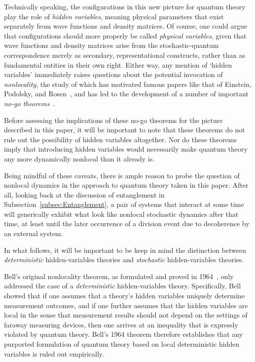 \documentclass[12pt,english,prl,superscriptaddress,nobibnotes,nofootinbib]{revtex4-2}
\begin{document}
Technically speaking, the configurations in this new picture for quantum
theory play the role of \emph{hidden variables}, meaning physical
parameters that exist separately from wave functions and density matrices.
Of course, one could argue that configurations should more properly
be called\emph{ }\emph{physical variables}, given that wave functions
and density matrices arise from the stochastic-quantum correspondence
merely as secondary, representational constructs, rather than as fundamental
entities in their own right. Either way, any mention of \textquoteleft hidden
variables\textquoteright{} immediately raises questions about the
potential invocation of \emph{nonlocality}, the study of which has
motivated famous papers like that of Einstein, Podolsky, and Rosen~\citep{EinsteinPodolskyRosen:1935cqmdprbcc},
and has led to the development of a number of important \emph{no-go theorems}~\citep{Bell:1964oeprp,ClauserHorneShimonyHolt:1969pettlhvt,Bell:1975ttolb,GreenbergerHorneZeilinger:1989gbbt}.

Before assessing the implications of these no-go theorems for the
picture described in this paper, it will be important to note that
these theorems do not rule out the possibility of hidden variables
altogether. Nor do these theorems imply that introducing hidden variables
would necessarily make quantum theory any more dynamically nonlocal
than it already is.

Being mindful of these caveats, there is ample reason to probe the
question of nonlocal dynamics in the approach to quantum theory taken
in this paper. After all, looking back at the discussion of entanglement
in Subsection~\ref{subsec:Entanglement}, a pair of systems that
interact at some time will generically exhibit what look like nonlocal
stochastic dynamics after that time, at least until the later occurrence
of a division event due to decoherence by an external system.

In what follows, it will be important to be keep in mind the distinction
between \emph{deterministic} hidden-variables theories and \emph{stochastic}
hidden-variables theories.

Bell's original nonlocality theorem, as formulated and proved in 1964~\citep{Bell:1964oeprp},
only addressed the case of a \emph{deterministic} hidden-variables
theory. Specifically, Bell showed that if one assumes that a theory's
hidden variables uniquely determine measurement outcomes, and if one
further assumes that the hidden variables are local in the sense that
measurement results should not depend on the settings of faraway measuring
devices, then one arrives at an inequality that is expressly violated
by quantum theory. Bell's 1964 theorem therefore establishes that
any purported formulation of quantum theory based on local deterministic
hidden variables is ruled out empirically.
\end{document}
